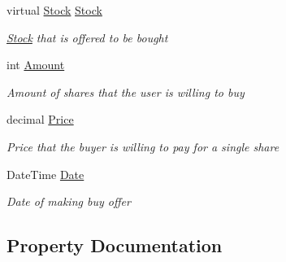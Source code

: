 \begin{DoxyCompactItemize}
virtual \mbox{\hyperlink{class_gielda_l2_1_1_d_b_1_1_entities_1_1_stock}{Stock}} \mbox{\hyperlink{class_gielda_l2_1_1_d_b_1_1_entities_1_1_buy_offer_a05805a997f41df5915ccd9ac2b6f6302}{Stock}}
\begin{DoxyCompactList}\small\item\em \mbox{\hyperlink{class_gielda_l2_1_1_d_b_1_1_entities_1_1_stock}{Stock}} that is offered to be bought \end{DoxyCompactList}\item 
int \mbox{\hyperlink{class_gielda_l2_1_1_d_b_1_1_entities_1_1_buy_offer_ac09431eeb35d383b279d867a1093a6c9}{Amount}}
\begin{DoxyCompactList}\small\item\em Amount of shares that the user is willing to buy \end{DoxyCompactList}\item 
decimal \mbox{\hyperlink{class_gielda_l2_1_1_d_b_1_1_entities_1_1_buy_offer_afee4dc98719eb636e37b9ad1e1612a79}{Price}}
\begin{DoxyCompactList}\small\item\em Price that the buyer is willing to pay for a single share \end{DoxyCompactList}\item 
Date\+Time \mbox{\hyperlink{class_gielda_l2_1_1_d_b_1_1_entities_1_1_buy_offer_a0516b3297452fb7a2f1d717c115cbeb3}{Date}}
\begin{DoxyCompactList}\small\item\em Date of making buy offer \end{DoxyCompactList}\end{DoxyCompactItemize}


\subsection{Property Documentation}
\mbox{\label{class_gielda_l2_1_1_d_b_1_1_entities_1_1_buy_offer_ac09431eeb35d383b279d867a1093a6c9}} 
